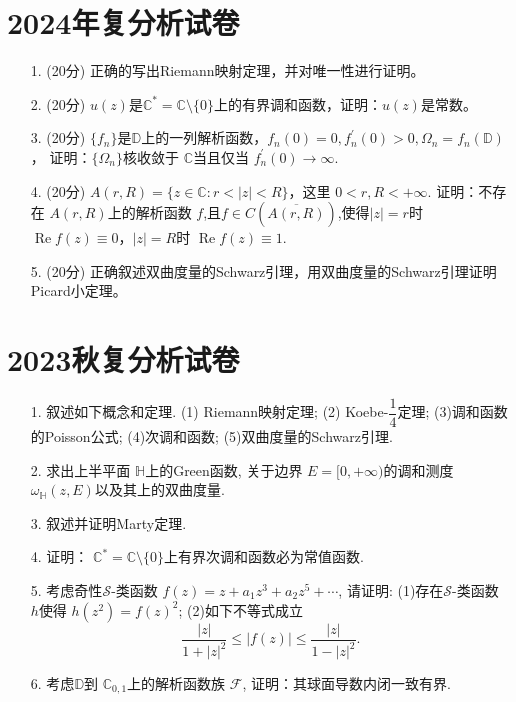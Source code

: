 
\section{2024年复分析试卷}
\begin{itemize}
    \item[1.] (20分) 正确的写出Riemann映射定理，并对唯一性进行证明。
    \item[2.] (20分) $u(z)$是$\mathbb{C}^*=\mathbb{C}\setminus\{0\}$上的有界调和函数，证明：$u(z)$是常数。
    \item[3.] (20分) $\{f_n\}$是$\mathbb{D}$上的一列解析函数，$f_n(0)=0,f_n^\prime(0)>0,\Omega_n=f_n(\mathbb{D})$，
    证明：$\{\Omega_n\}$核收敛于 $\mathbb{C}$当且仅当 $f_n^\prime(0)\to\infty$.
    \item[4.] (20分) $A(r,R)=\{z\in\mathbb{C}:r<|z|<R\}$，这里 $0<r,R<+\infty$.
    证明：不存在 $A(r,R)$上的解析函数 $f$,且$f\in C(\overline{A(r,R)})$,使得$|z|=r$时 $\operatorname{Re}f(z)\equiv0$，$|z|=R$时 $\operatorname{Re}f(z)\equiv1$.
    \item[5.] (20分) 正确叙述双曲度量的Schwarz引理，用双曲度量的Schwarz引理证明Picard小定理。
\end{itemize}


\section{2023秋复分析试卷}
\begin{itemize}
    \item[1.] 叙述如下概念和定理. (1) Riemann映射定理; (2) Koebe-$\dfrac{1}{4}$定理; 
    (3)调和函数的Poisson公式; (4)次调和函数; (5)双曲度量的Schwarz引理.

    \item[2.] 求出上半平面 $\mathbb{H}$上的Green函数, 
    关于边界 $E=[0,+\infty)$的调和测度 $\omega_{\mathbb{H}}(z,E)$以及其上的双曲度量.

    \item[3.] 叙述并证明Marty定理.

    \item[4.] 证明： $\mathbb{C}^*= \mathbb{C}\setminus\{0\}$上有界次调和函数必为常值函数.

    \item[5.] 考虑奇性$\mathcal{S}$-类函数 $f(z) = z + a_1 z^3+ a_2 z^5+ \cdots$, 
    请证明: (1)存在$\mathcal{S}$-类函数 $h$使得 $h(z^2) = f(z)^2$; (2)如下不等式成立
    $$\dfrac{|z|}{1+|z|^2}\le |f(z)|\le \dfrac{|z|}{1-|z|^2}.$$


    \item[6.] 考虑$\mathbb{D}$到 $\mathbb{C}_{0,1}$上的解析函数族 $\mathcal{F}$, 
    证明：其球面导数内闭一致有界.
\end{itemize}


